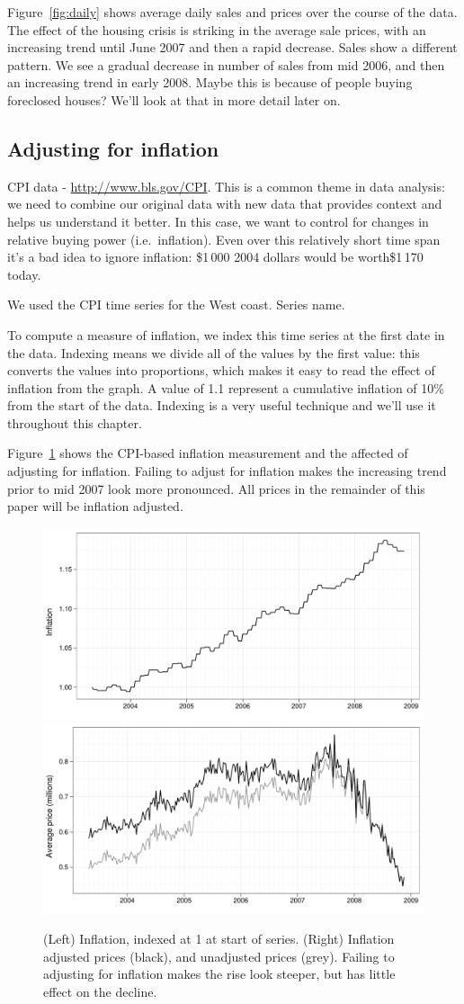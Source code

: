 \documentclass[oneside]{article}
\begin{document}
Figure~\ref{fig:daily} shows average daily sales and prices over the course of the data.  The effect of the housing crisis is striking in the average sale prices, with an increasing trend until June 2007 and then a rapid decrease.  Sales show a different pattern.  We see a gradual decrease in number of sales from mid 2006, and then an increasing trend in early 2008. Maybe this is because of people buying foreclosed houses?  We'll look at that in more detail later on.

\subsection{Adjusting for inflation}

CPI data - \url{http://www.bls.gov/CPI}.  This is a common theme in data analysis: we need to combine our original data with new data that provides context and helps us understand it better.  In this case, we want to control for changes in relative buying power (i.e.\ inflation).  Even over this relatively short time span it's a bad idea to ignore inflation: \$1\,000 2004 dollars would be worth\$1\,170 today.

We used the CPI time series for the West coast.  Series name.

To compute a measure of inflation, we index this time series at the first date in the data.  Indexing means we divide all of the values by the first value: this converts the values into proportions, which makes it easy to read the effect of inflation from the graph.  A value of 1.1 represent a cumulative inflation of 10\% from the start of the data.  Indexing is a very useful technique and we'll use it throughout this chapter.

Figure~\ref{fig:inflation} shows the CPI-based inflation measurement and the affected of adjusting for inflation.  Failing to adjust for inflation makes the increasing trend prior to mid 2007 look more pronounced.  All prices in the remainder of this paper will be inflation adjusted.

\begin{figure}[htbp]
  \centering
    \includegraphics[width=0.5 \linewidth]{daily-cpi}%
    \includegraphics[width=0.5 \linewidth]{daily-price-adj}
  \caption{(Left) Inflation, indexed at 1 at start of series.  (Right) Inflation adjusted prices (black), and unadjusted prices (grey).  Failing to adjusting for inflation makes the rise look steeper, but has little effect on the decline.}
  \label{fig:inflation}
\end{figure}
\end{document}
